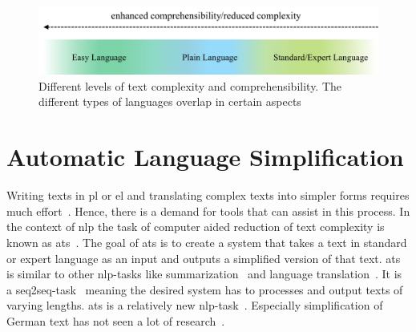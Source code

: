 \begin{figure}
    \centering
    \includegraphics[width=\linewidth]{images/easy_languages}
    \caption[Different levels of text complexity and comprehensibility.]{Different levels of text complexity and comprehensibility. The different types of languages overlap in certain aspects~\autocite{easyLanguageBook, selbsterstellt}}
    \label{fig:languages}
\end{figure}




%
%
%
%


%


%


\section{Automatic Language Simplification}\label{sec:langSimp}

Writing texts in \gls{pl} or \gls{el} and translating complex texts into simpler forms requires much effort~\autocite{easyLanguageBook}.
Hence, there is a demand for tools that can assist in this process.
In the context of \gls{nlp} the task of computer aided reduction of text complexity is known as \gls{ats}~\autocite{Ansch_tz_2023}.
The goal of \gls{ats} is to create a system that takes a text in standard or expert language as an input and outputs a simplified version of that text.
\gls{ats} is similar to other \gls{nlp}-tasks like summarization~\autocite{rios-etal-2021-new} and language translation~\autocite{aumiller2022klexikon}.
It is a \gls{seq2seq}-task~\autocite{Ansch_tz_2023} meaning the desired system has to processes and output texts of varying lengths.
\gls{ats} is a relatively new \gls{nlp}-task~\autocite{schomacker2023data}.
Especially simplification of German text has not seen a lot of research~\autocite{Ansch_tz_2023}.

